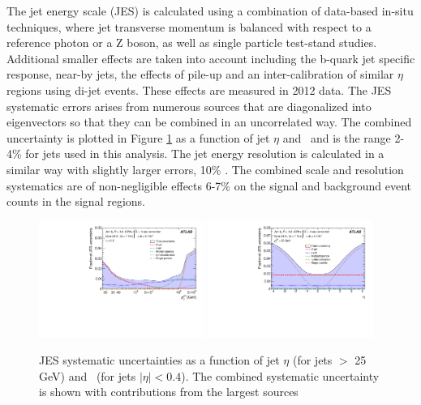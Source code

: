 The jet energy scale (JES) is calculated using a combination of data-based in-situ techniques, where jet transverse momentum is balanced with respect to a reference photon or a Z boson, as well as single particle test-stand studies\cite{Aad:2014bia}. Additional smaller effects are taken into account including the b-quark jet specific response, near-by jets, the effects of pile-up and an inter-calibration of similar $\eta$ regions using di-jet events. These effects are measured in 2012 data. The JES systematic errors arises from numerous sources that are diagonalized into eigenvectors so that they can be combined in an uncorrelated way. The combined uncertainty is plotted in Figure \ref{figure:systematics_jes} as a function of jet $\eta$ and \pt\ and is the range 2-4\% for jets used in this analysis. The jet energy resolution is calculated in a similar way with slightly larger errors, 10\% \cite{Aad:2012ag}. The combined scale and resolution systematics are of non-negligible effects 6-7\% on the signal and background event counts in the signal regions.  


\begin{figure}[htbp]
\begin{center}
\includegraphics[width=0.48\textwidth]{figs/systematics/fig_61a}
\includegraphics[width=0.48\textwidth]{figs/systematics/fig_61c}
\caption{JES systematic uncertainties as a function of jet $\eta$ (for jets \pt $>$ 25 GeV) and \pt\ (for jets $|\eta|<0.4$). The combined systematic uncertainty is shown with contributions from the largest sources}
\label{figure:systematics_jes}
\end{center}
\end{figure}


